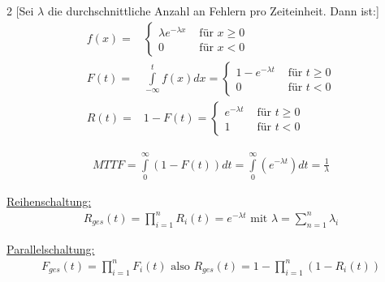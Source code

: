 			\begin{multicols}{2}
			[Sei $\lambda$ die durchschnittliche Anzahl an Fehlern pro Zeiteinheit. Dann ist:]				
			\begin{align*}
				f(x)=&
				\begin{cases}
					\lambda e^{-\lambda x} & \text{ für } x\geq0\\
					0 & \text{ für } x<0
				\end{cases}\\
				F(t)=&\int\limits_{-\infty}^t f(x) dx =
				\begin{cases}
					1-e^{-\lambda t} & \text{ für } t\geq0\\
					0 & \text{ für } t<0
				\end{cases}\\
				R(t)=&1-F(t) =
				\begin{cases}
					e^{-\lambda t} & \text{ für } t\geq0\\
					1 & \text{ für } t<0
				\end{cases}
			\end{align*}
			
			\columnbreak
			
			
			\end{multicols}
			
			\begin{align*}
				MTTF = \int\limits_{0}^\infty (1-F(t)) dt = \int\limits_{0}^\infty (e^{-\lambda t}) dt = \frac{1}{\lambda}					
			\end{align*}
			
			\underline{Reihenschaltung:}
			\begin{align*}
				R_{ges}(t)=\prod\limits_{i=1}^nR_i(t)=e^{-\lambda t} \text{ mit } \lambda=\sum\limits_{n=1}^n\lambda_i
			\end{align*}
			
			\underline{Parallelschaltung:}
			\begin{align*}
				F_{ges}(t)=\prod\limits_{i=1}^nF_i(t) \text{ also } R_{ges}(t)=1-\prod\limits_{i=1}^n(1-R_i(t))
			\end{align*}
			
